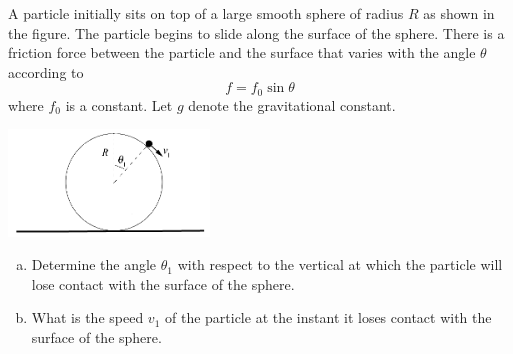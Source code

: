 \documentclass{esg8012exam}
\begin{document}
\begin{problem}{35}
  A particle initially sits on top of a large smooth sphere of radius $R$ as shown in the figure. The particle begins to slide along the surface of the sphere. There is a friction force between the particle and the surface that varies with the angle $\theta$ according to
  $$f = f_0\sin\theta$$
  where $f_0$ is a constant. Let $g$ denote the gravitational constant.
  \begin{center}\includegraphics[width=0.4\textwidth]{exam2_p2_1}\end{center}
  \begin{enumerate}[(a)]
    \item Determine the angle $\theta_1$ with respect to the vertical at which the particle will lose contact with the surface of the sphere.
    \item What is the speed $v_1$ of the particle at the instant it loses contact with the surface of the sphere.
  \end{enumerate}
\end{problem}
\end{document}
